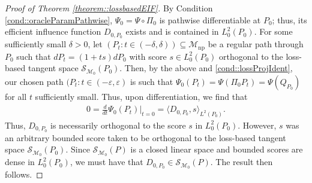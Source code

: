 \documentclass[11pt]{article}
\theoremstyle{definition}
\begin{document}
\begin{proof}[Proof of Theorem \ref{theorem::lossbasedEIF}]
 
 By Condition \ref{cond::oracleParamPathwise}, $\Psi_0 = \Psi \circ \Pi_0$ is pathwise differentiable at $P_0$; thus, its efficient influence function $D_{0,P_0}$ exists and is contained in $ L^2_0(P_0)$. For some sufficiently small $\delta > 0$, let $(P_t  : t \in (-\delta, \delta)) \subseteq \mathcal{M}_{\mathrm{np}}$ be a regular path through $P_0$ such that $dP_t = (1+ ts) dP_0$ with score $s \in L^2_0(P_0)$ orthogonal to the loss-based tangent space $\mathcal{S}_{\mathcal{M}_0}(P_0)$. Then, by the above and \ref{cond::lossProjIdent}, our chosen path $(P_t: t \in (-\varepsilon, \varepsilon)$ is such that
 $\Psi_0(P_t) = \Psi(\Pi_0 P_t) = \Psi(Q_{P_0})$
 for all $t$ sufficiently small. Thus, upon differentiation, we find that
 \begin{align*}
   0 =  \frac{d}{dt} \Psi_0(P_t) \big |_{t=0} = \langle D_{0,P_0}, s \rangle_{L^2(P_0)}.
 \end{align*}
 Thus, $D_{0,P_0}$ is necessarily orthogonal to the score $s$ in $L^2_0(P_0)$. However, $s$ was an arbitrary bounded score taken to be orthogonal to the loss-based tangent space $\mathcal{S}_{\mathcal{M}_0}(P_0)$. Since $\mathcal{S}_{\mathcal{M}_0}(P)$ is a closed linear space and bounded scores are dense in $L^2_0(P_0)$, we must have that $D_{0,P_0} \in \mathcal{S}_{\mathcal{M}_0}(P)$. The result then follows.

 
 
 
 
 \end{proof}
\end{document}
